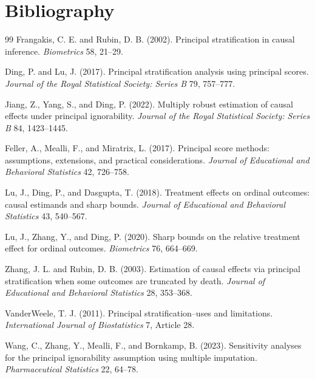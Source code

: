 \documentclass[11pt]{article}
\theoremstyle{definition}
\theoremstyle{plain}
\theoremstyle{remark}
\begin{document}
\section*{Bibliography}
\begin{thebibliography}{99}
Frangakis, C. E. and Rubin, D. B. (2002).
Principal stratification in causal inference.
\emph{Biometrics} 58, 21--29.

Ding, P. and Lu, J. (2017).
Principal stratification analysis using principal scores.
\emph{Journal of the Royal Statistical Society: Series B} 79, 757--777.

Jiang, Z., Yang, S., and Ding, P. (2022).
Multiply robust estimation of causal effects under principal ignorability.
\emph{Journal of the Royal Statistical Society: Series B} 84, 1423--1445.

Feller, A., Mealli, F., and Miratrix, L. (2017).
Principal score methods: assumptions, extensions, and practical considerations.
\emph{Journal of Educational and Behavioral Statistics} 42, 726--758.

Lu, J., Ding, P., and Dasgupta, T. (2018).
Treatment effects on ordinal outcomes: causal estimands and sharp bounds.
\emph{Journal of Educational and Behavioral Statistics} 43, 540--567.

Lu, J., Zhang, Y., and Ding, P. (2020).
Sharp bounds on the relative treatment effect for ordinal outcomes.
\emph{Biometrics} 76, 664--669.

Zhang, J. L. and Rubin, D. B. (2003).
Estimation of causal effects via principal stratification when some outcomes are truncated by death.
\emph{Journal of Educational and Behavioral Statistics} 28, 353--368.

VanderWeele, T. J. (2011).
Principal stratification--uses and limitations.
\emph{International Journal of Biostatistics} 7, Article 28.

Wang, C., Zhang, Y., Mealli, F., and Bornkamp, B. (2023).
Sensitivity analyses for the principal ignorability assumption using multiple imputation.
\emph{Pharmaceutical Statistics} 22, 64--78.


\end{thebibliography}
\end{document}
